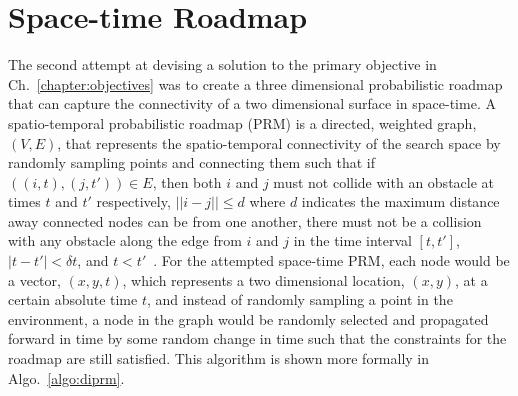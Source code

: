 \section{Space-time Roadmap}

\label{sec:stroadmap}

The second attempt at devising a solution to the primary objective in
Ch.~\ref{chapter:objectives} was to create a three dimensional probabilistic
roadmap that can capture the connectivity of a two dimensional surface in
space-time. A spatio-temporal probabilistic roadmap (PRM) is a directed,
weighted graph, $(V, E)$, that represents the spatio-temporal connectivity of
the search space by randomly sampling points and connecting them such that if
$((i, t), (j, t')) \in E$, then both $i$ and $j$ must not collide with an
obstacle at times $t$ and $t'$ respectively, $||i - j|| \leq d$ where $d$
indicates the maximum distance away connected nodes can be from one another,
there must not be a collision with any obstacle along the edge from $i$ and $j$
in the time interval $[t, t']$, $|t - t'| < \delta t$, and $t < t'$~\cite{prm,
stprm}.  For the attempted space-time PRM, each node would be a vector, $(x, y,
t)$, which represents a two dimensional location, $(x, y)$, at a certain
absolute time $t$, and instead of randomly sampling a point in the environment,
a node in the graph would be randomly selected and propagated forward in time
by some random change in time such that the constraints for the roadmap are
still satisfied.  This algorithm is shown more formally in
Algo.~\ref{algo:diprm}.

